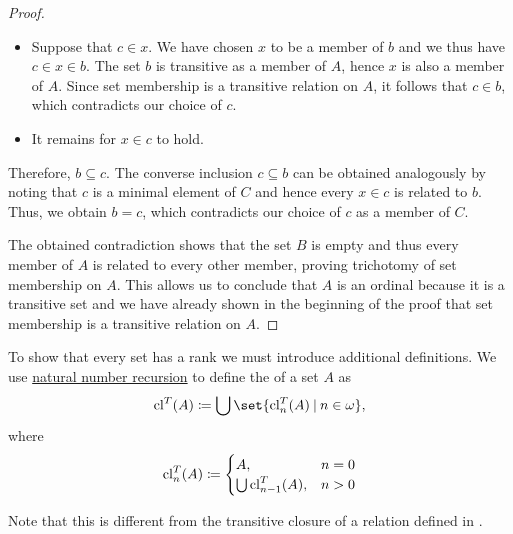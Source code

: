 \begin{proof}
\begin{itemize}
    \item Suppose that \( c \in x \). We have chosen \( x \) to be a member of \( b \) and we thus have \( c \in x \in b \). The set \( b \) is transitive as a member of \( A \), hence \( x \) is also a member of \( A \). Since set membership is a transitive relation on \( A \), it follows that \( c \in b \), which contradicts our choice of \( c \).

    \item It remains for \( x \in c \) to hold.
  \end{itemize}

  Therefore, \( b \subseteq c \). The converse inclusion \( c \subseteq b \) can be obtained analogously by noting that \( c \) is a minimal element of \( C \) and hence every \( x \in c \) is related to \( b \). Thus, we obtain \( b = c \), which contradicts our choice of \( c \) as a member of \( C \).

  The obtained contradiction shows that the set \( B \) is empty and thus every member of \( A \) is related to every other member, proving trichotomy of set membership on \( A \). This allows us to conclude that \( A \) is an ordinal because it is a transitive set and we have already shown in the beginning of the proof that set membership is a transitive relation on \( A \).
\end{proof}

\begin{definition}\label{def:transitive_closure_of_a_set}
  To show that every set has a rank we must introduce additional definitions. We use \hyperref[rem:natural_number_recursion]{natural number recursion} to define the  of a set \( A \) as
  \begin{equation*}
    \cl^T(A) \coloneqq \bigcup \set{ \cl_n^T(A) \given n \in \omega },
  \end{equation*}
  where
  \begin{equation*}
    \operatorname{cl}_n^T(A) \coloneqq \begin{cases}
      A,              &n = 0 \\
      \bigcup \operatorname{cl}_{n-1}^T(A), &n > 0
    \end{cases}
  \end{equation*}

  Note that this is different from the transitive closure of a relation defined in .
\end{definition}

